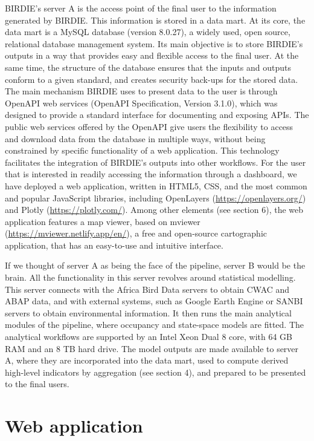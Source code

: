 \documentclass[utf8]{frontiersSCNS}
\begin{document}
BIRDIE's server A is the access point of the final user to the
information generated by BIRDIE. This information is stored in a data
mart. At its core, the data mart is a MySQL database (version 8.0.27), a
widely used, open source, relational database management system. Its
main objective is to store BIRDIE's outputs in a way that provides easy
and flexible access to the final user. At the same time, the structure
of the database ensures that the inputs and outputs conform to a given
standard, and creates security back-ups for the stored data. The main
mechanism BIRDIE uses to present data to the user is through OpenAPI web
services (OpenAPI Specification, Version 3.1.0), which was designed to
provide a standard interface for documenting and exposing APIs. The
public web services offered by the OpenAPI give users the flexibility to
access and download data from the database in multiple ways, without
being constrained by specific functionality of a web application. This
technology facilitates the integration of BIRDIE's outputs into other
workflows. For the user that is interested in readily accessing the
information through a dashboard, we have deployed a web application,
written in HTML5, CSS, and the most common and popular JavaScript
libraries, including OpenLayers (\url{https://openlayers.org/}) and
Plotly (\url{https://plotly.com/}). Among other elements (see section
6), the web application features a map viewer, based on mviewer
(\url{https://mviewer.netlify.app/en/}), a free and open-source
cartographic application, that has an easy-to-use and intuitive
interface.

If we thought of server A as being the face of the pipeline, server B
would be the brain. All the functionality in this server revolves around
statistical modelling. This server connects with the Africa Bird Data
servers to obtain CWAC and ABAP data, and with external systems, such as
Google Earth Engine or SANBI servers to obtain environmental
information. It then runs the main analytical modules of the pipeline,
where occupancy and state-space models are fitted. The analytical
workflows are supported by an Intel Xeon Dual 8 core, with 64 GB RAM and
an 8 TB hard drive. The model outputs are made available to server A,
where they are incorporated into the data mart, used to compute derived
high-level indicators by aggregation (see section 4), and prepared to be
presented to the final users.

\hypertarget{web-application}{%
\section*{Web application}\label{web-application}}
\end{document}
